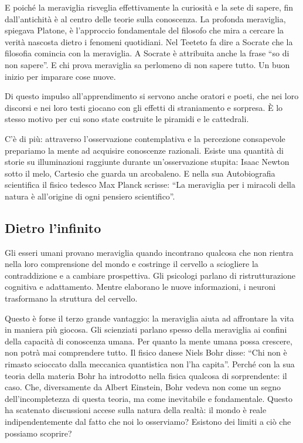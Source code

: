 \documentclass[11pt]{report}
\begin{document}
E poiché la meraviglia risveglia effettivamente la curiosità e la sete di sapere, fin dall’antichità è al centro delle teorie sulla conoscenza. La profonda meraviglia, spiegava Platone, è l’approccio fondamentale del filosofo che mira a cercare la verità nascosta dietro i fenomeni quotidiani. Nel Teeteto fa dire a Socrate che la filosofia comincia con la meraviglia. A Socrate è attribuita anche la frase “so di non sapere”. E chi prova meraviglia sa perlomeno di non sapere tutto. Un buon inizio per imparare cose nuove.

Di questo impulso all’apprendimento si servono anche oratori e poeti, che nei loro discorsi e nei loro testi giocano con gli effetti di straniamento e sorpresa. È lo stesso motivo per cui sono state costruite le piramidi e le cattedrali.

C’è di più: attraverso l’osservazione contemplativa e la percezione consapevole prepariamo la mente ad acquisire conoscenze razionali. Esiste una quantità di storie su illuminazioni raggiunte durante un’osservazione stupita: Isaac Newton sotto il melo, Cartesio che guarda un arcobaleno. E nella sua Autobiografia scientifica il fisico tedesco Max Planck scrisse: “La meraviglia per i miracoli della natura è all’origine di ogni pensiero scientifico”.

\subsection*{Dietro l’infinito}

Gli esseri umani provano meraviglia quando incontrano qualcosa che non rientra nella loro comprensione del mondo e costringe il cervello a sciogliere la contraddizione e a cambiare prospettiva. Gli psicologi parlano di ristrutturazione cognitiva e adattamento. Mentre elaborano le nuove informazioni, i neuroni trasformano la struttura del cervello.

Questo è forse il terzo grande vantaggio: la meraviglia aiuta ad affrontare la vita in maniera più giocosa. Gli scienziati parlano spesso della meraviglia ai confini della capacità di conoscenza umana. Per quanto la mente umana possa crescere, non potrà mai comprendere tutto. Il fisico danese Niels Bohr disse: “Chi non è rimasto scioccato dalla meccanica quantistica non l’ha capita”. Perché con la sua teoria della materia Bohr ha introdotto nella fisica qualcosa di sorprendente: il caso. Che, diversamente da Albert Einstein, Bohr vedeva non come un segno dell’incompletezza di questa teoria, ma come inevitabile e fondamentale. Questo ha scatenato discussioni accese sulla natura della realtà: il mondo è reale indipendentemente dal fatto che noi lo osserviamo? Esistono dei limiti a ciò che possiamo scoprire?
\end{document}
